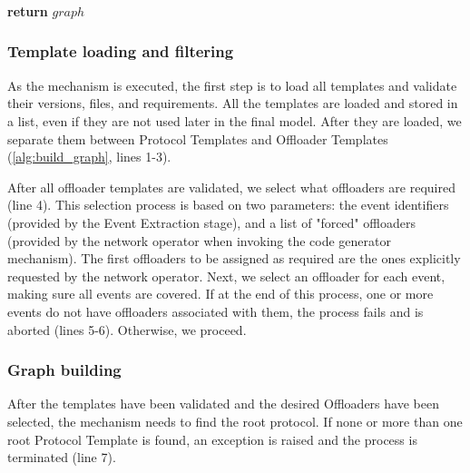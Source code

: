 \begin{algorithm}[htb]
     \\
    
    \vspace{1em}
            
     \\
     \\
     \\
     \\
    
    \vspace{1em}
            
    \textbf{return} $graph$  \\
\end{algorithm}


\subsubsection*{Template loading and filtering}

As the mechanism is executed, the first step is to load all templates and validate their versions, files, and requirements. All the templates are loaded and stored in a list, even if they are not used later in the final model. After they are loaded, we separate them between Protocol Templates and Offloader Templates (\autoref{alg:build_graph}, lines 1-3).

After all offloader templates are validated, we select what offloaders are required (line 4). This selection process is based on two parameters: the event identifiers (provided by the Event Extraction stage), and a list of "forced" offloaders (provided by the network operator when invoking the code generator mechanism). The first offloaders to be assigned as required are the ones explicitly requested by the network operator. Next, we select an offloader for each event, making sure all events are covered. If at the end of this process, one or more events do not have offloaders associated with them, the process fails and is aborted (lines 5-6). Otherwise, we proceed.

\subsubsection*{Graph building}

After the templates have been validated and the desired Offloaders have been selected, the mechanism needs to find the root protocol. If none or more than one root Protocol Template is found, an exception is raised and the process is terminated (line 7).

